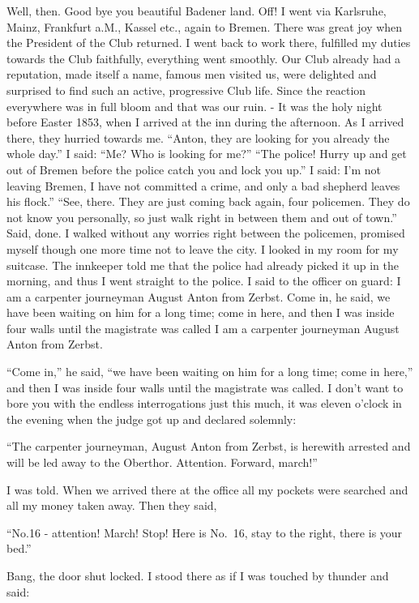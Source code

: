 \documentclass{article}
\begin{document}
Well, then. Good bye you beautiful Badener land. Off! I went via Karlsruhe, Mainz, Frankfurt a.M., Kassel etc., again to Bremen. There was great joy when the President of the Club returned. I went back to work there, fulfilled my duties towards the Club faithfully, everything went smoothly. Our Club already had a reputation, made itself a name, famous men visited us, were delighted and surprised to find such an active, progressive Club life. Since the reaction everywhere was in full bloom and that was our ruin. - It was the holy night before Easter 1853, when I arrived at the inn during the afternoon. As I arrived there, they hurried towards me. ``Anton, they are looking for you already the whole day.'' I said: ``Me? Who is looking for me?'' ``The police! Hurry up and get out of Bremen before the police catch you and lock you up.'' I said: I'm not leaving Bremen, I have not committed a crime, and only a bad shepherd leaves his flock.'' ``See, there. They are just coming back again, four policemen. They do not know you personally, so just walk right in between them and out of town.'' Said, done. I walked without any worries right between the policemen, promised myself though one more time not to leave the city. I looked in my room for my suitcase. The innkeeper told me that the police had already picked it up in the morning, and thus I went straight to the police. I said to the officer on guard: I am a carpenter journeyman August Anton from Zerbst. Come in, he said, we have been waiting on him for a long time; come in here, and then I was inside four walls until the magistrate was called I am a carpenter journeyman August Anton from Zerbst.

``Come in,'' he said, ``we have been waiting on him for a long time; come in here,'' and then I was inside four walls until the magistrate was called. I don't want to bore you with the endless interrogations just this much, it was eleven o'clock in the evening when the judge got up and declared solemnly:

``The carpenter journeyman, August Anton from Zerbst, is herewith arrested and will be led away to the Oberthor. Attention. Forward, march!''

I was told. When we arrived there at the office all my pockets were searched and all my money taken away. Then they said,

``No.16 - attention! March! Stop! Here is No.~16, stay to the right, there is your bed.''

Bang, the door shut locked. I stood there as if I was touched by thunder and said:
\end{document}
